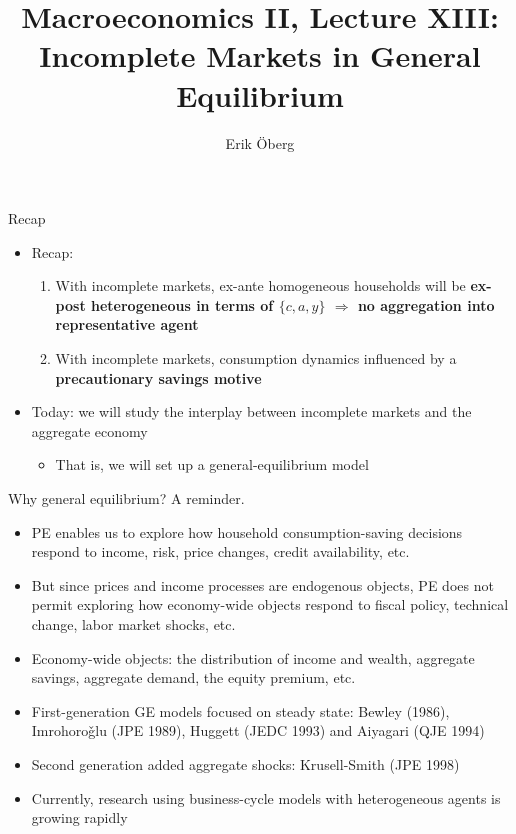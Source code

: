 \documentclass[9pt]{beamer}
\title[Incomplete Markets in General Equilibrium]{\large Macroeconomics II, Lecture XIII:\\
	Incomplete Markets in General Equilibrium}
\author{Erik {\"O}berg}
\date{}
\newcommand{\bit}{\begin{itemize}}
\newcommand{\eit}{\end{itemize}}
\newcommand{\ben}{\begin{enumerate}}
\newcommand{\een}{\end{enumerate}}
\begin{document}
\begin{frame}
\vspace*{-1.5em}
\titlepage
\end{frame}

\begin{frame}{Recap}

\bit
\setlength\itemsep{2em}

\item Recap:
\ben
\setlength\itemsep{1em}
\item With incomplete markets, ex-ante homogeneous households will be \bf ex-post heterogeneous \normalfont in terms of $\{c,a,y\}$ $\Rightarrow$ no aggregation into representative agent

\item With incomplete markets, consumption dynamics influenced by a \bf precautionary savings \normalfont motive

\een

\item Today: we will study the interplay between incomplete markets and the aggregate economy
\bit
	\item That is, we will set up a general-equilibrium model
\eit

\eit

\end{frame}

\begin{frame}{Why general equilibrium? A reminder.}

\bit
\setlength\itemsep{1.5em}

\item PE enables us to explore how household consumption-saving decisions respond to income, risk, price changes, credit availability, etc.

\item But since prices and income processes are endogenous objects, PE does not permit exploring how economy-wide objects respond to fiscal policy, technical change, labor market shocks, etc.

\item Economy-wide objects: the distribution of income and wealth, aggregate savings, aggregate demand, the equity premium, etc.

\item First-generation GE models focused on steady state: Bewley (1986), Imrohoro\v{g}lu (JPE 1989), Huggett (JEDC 1993) and Aiyagari (QJE 1994)

\item Second generation added aggregate shocks: Krusell-Smith (JPE 1998)

\item Currently, research using business-cycle models with heterogeneous agents is growing rapidly

\eit

\end{frame}
\end{document}
